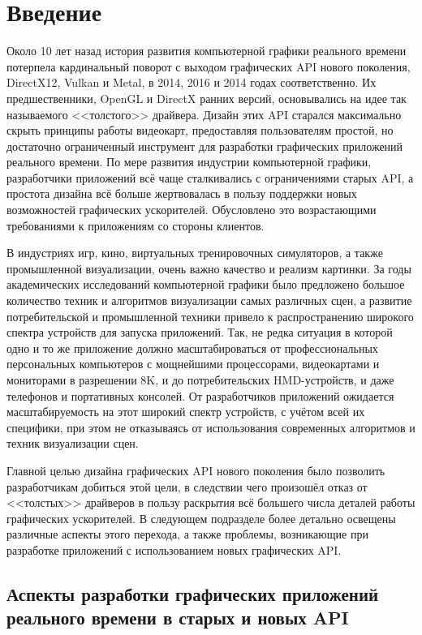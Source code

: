 \section{Введение}
Около 10 лет назад история развития компьютерной графики реального времени потерпела кардинальный поворот с выходом графических API нового поколения, DirectX12, Vulkan и Metal, в 2014, 2016 и 2014 годах соответственно.
Их предшественники, OpenGL и DirectX ранних версий, основывались на идее так называемого <<толстого>> драйвера.
Дизайн этих API старался максимально скрыть принципы работы видеокарт, предоставляя пользователям простой, но достаточно ограниченный инструмент для разработки графических приложений реального времени.
По мере развития индустрии компьютерной графики, разработчики приложений всё чаще сталкивались с ограничениями старых API, а простота дизайна всё больше жертвовалась в пользу поддержки новых возможностей графических ускорителей.
Обусловлено это возрастающими требованиями к приложениям со стороны клиентов.

В индустриях игр, кино, виртуальных тренировочных симуляторов, а также промышленной визуализации, очень важно качество и реализм картинки.
За годы академических исследований компьютерной графики было предложено большое количество техник и алгоритмов визуализации самых различных сцен, а развитие потребительской и промышленной техники привело к распространению широкого спектра устройств для запуска приложений.
Так, не редка ситуация в которой одно и то же приложение должно масштабироваться от профессиональных персональных компьютеров с мощнейшими процессорами, видеокартами и мониторами в разрешении 8K, и до потребительских HMD-устройств, и даже телефонов и портативных консолей.
От разработчиков приложений ожидается масштабируемость на этот широкий спектр устройств, с учётом всей их специфики, при этом не отказываясь от использования современных алгоритмов и техник визуализации сцен.

Главной целью дизайна графических API нового поколения было позволить разработчикам добиться этой цели, в следствии чего произошёл отказ от <<толстых>> драйверов в пользу раскрытия всё большего числа деталей работы графических ускорителей.
В следующем подразделе более детально освещены различные аспекты этого перехода, а также проблемы, возникающие при разработке приложений с использованием новых графических API.

\subsection{Аспекты разработки графических приложений реального времени в старых и новых API}
